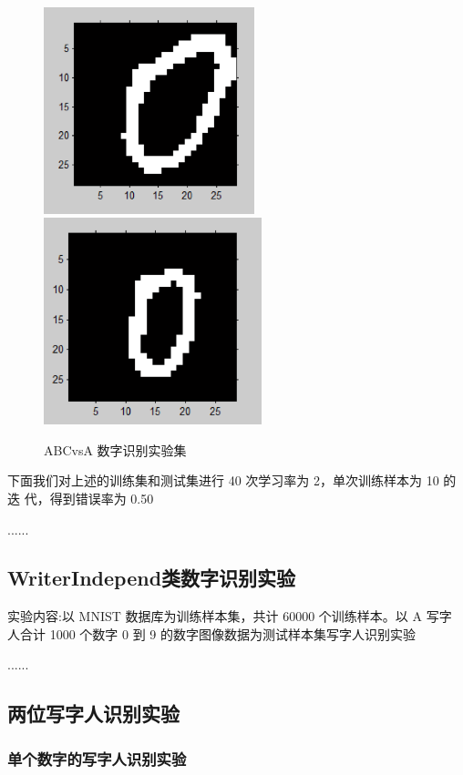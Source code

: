 \begin{figure}[!htp]
  \centering
    {\includegraphics[height=6cm]{figure/experiment1.png}}
  \hspace{4em}
    {\includegraphics[height=6cm]{figure/experiment2.png}}
  \caption{ABCvsA 数字识别实验集}
  \label{fig:pdfeps-subcaptionbox}
\end{figure}

下面我们对上述的训练集和测试集进行 40 次学习率为 2，单次训练样本为 10 的迭 代，得到错误率为 0.50%

......

\subsection{WriterIndepend类数字识别实验}
实验内容:以 MNIST 数据库为训练样本集，共计 60000 个训练样本。以 A 写字 人合计 1000 个数字 0 到 9 的数字图像数据为测试样本集写字人识别实验

......

\subsection{两位写字人识别实验}
\subsubsection{单个数字的写字人识别实验}

